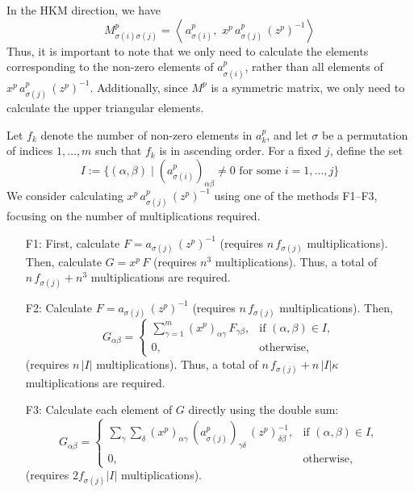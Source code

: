 \documentclass{scrartcl}
\newcommand{\inprod}[2]{\left\langle #1, \, #2 \right\rangle}
\begin{document}
\medskip

In the HKM direction, we have
\[
  M^p_{\sigma(i)\sigma(j)}
  = \inprod{\,a^p_{\sigma(i)}}{\,x^p\,a^p_{\sigma(j)}\,(z^p)^{-1}}
\]
Thus, it is important to note that we only need to calculate the elements corresponding to the non-zero elements of $a^p_{\sigma(i)}$, rather than all elements of $x^p\,a^p_{\sigma(j)}\,(z^p)^{-1}$.
Additionally, since $M^p$ is a symmetric matrix, we only need to calculate the upper triangular elements.

\medskip

Let $f_k$ denote the number of non-zero elements in $a^p_k$, and let $\sigma$ be a permutation of indices $1,\ldots,m$ such that $f_k$ is in ascending order.
For a fixed $j$, define the set
\[
  I
  := \bigl\{(\alpha,\beta)\mid (a^p_{\sigma(i)})_{\alpha\beta}\neq 0
         \text{ for some } i=1,\ldots,j \bigr\}
\]
We consider calculating $x^p\,a^p_{\sigma(j)}\,(z^p)^{-1}$ using one of the methods F1--F3, focusing on the number of multiplications required.

\begin{enumerate}
\item[F1:] First, calculate $F=a_{\sigma(j)}\,(z^p)^{-1}$ (requires $n\,f_{\sigma(j)}$ multiplications).
           Then, calculate $G=x^p\,F$ (requires $n^3$ multiplications).
           Thus, a total of $n\,f_{\sigma(j)} + n^3$ multiplications are required.
\item[F2:] Calculate $F=a_{\sigma(j)}\,(z^p)^{-1}$ (requires $n\,f_{\sigma(j)}$ multiplications). Then,
  \[
    G_{\alpha\beta}=
    \begin{cases}
     \sum_{\gamma=1}^m (x^p)_{\alpha\gamma}\,F_{\gamma\beta}, & \text{if } (\alpha,\beta)\in I,\\
     0, & \text{otherwise},
    \end{cases}
  \]
  (requires $n\,|I|$ multiplications).  
  Thus, a total of $n\,f_{\sigma(j)} + n\,|I|\kappa$ multiplications are required.
\item[F3:] Calculate each element of $G$ directly using the double sum:
  \[
    G_{\alpha\beta}=
    \begin{cases}
      \sum_{\gamma}\sum_{\delta}
        (x^p)_{\alpha\gamma}\,(a^p_{\sigma(j)})_{\gamma\delta}\,(z^p)^{-1}_{\delta\beta},
       & \text{if } (\alpha,\beta) \in I,\\
      0, & \text{otherwise},
    \end{cases}
  \]
  (requires $2f_{\sigma(j)}|I|$ multiplications).
\end{enumerate}
\end{document}
